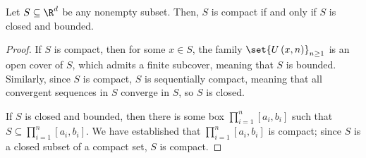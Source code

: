 \documentclass[10pt]{mypackage}
\begin{document}
\begin{theorem}
  Let $S\subseteq \R^d$ be any nonempty subset. Then, $S$ is compact if and only if $S$ is closed and bounded.
\end{theorem}
\begin{proof}
  If $S$ is compact, then for some $x\in S$, the family $\set{U\left( x,n \right)}_{n\geq 1}$ is an open cover of $S$, which admits a finite subcover, meaning that $S$ is bounded. Similarly, since $S$ is compact, $S$ is sequentially compact, meaning that all convergent sequences in $S$ converge in $S$, so $S$ is closed.\newline

  If $S$ is closed and bounded, then there is some box $\prod_{i=1}^{n}\left[ a_i,b_i \right]$ such that $S\subseteq \prod_{i=1}^{n}\left[ a_i,b_i \right]$. We have established that $\prod_{i=1}^{n}\left[ a_i,b_i \right]$ is compact; since $S$ is a closed subset of a compact set, $S$ is compact.
\end{proof}
\end{document}
